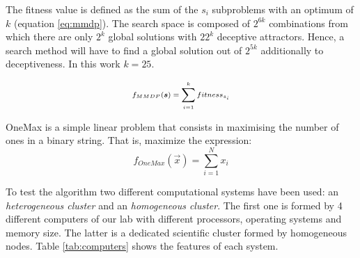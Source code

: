 The fitness value is defined as the sum of the $s_i$ subproblems with an optimum of $k$ (equation \ref{eq:mmdp}).
The search space is composed of $2^{6k}$ combinations from which there
are only $2^k$ global solutions with $22^k$ deceptive
attractors. Hence, a search method will have to find a global solution
out of $2^{5k}$ additionally to deceptiveness. In this work $k=25$. 

\begin{equation}\label{eq:mmdp}
\scriptsize
f_{MMDP}(\vec s)= \sum_{i=1}^{k} fitness_{s_i}
\end{equation}

OneMax is a simple linear problem that consists in maximising the number of ones in a binary string. That is, maximize the expression:
\begin{equation}
f_{OneMax}(\vec{x}) = \sum_{i=1}^{N}{x_{i}}
\end{equation}


To test the algorithm two different computational systems have been used: an {\em heterogeneous cluster} and an {\em homogeneous cluster}. The first one is formed by 4 different computers of our lab with different processors, operating systems and memory size. The latter is a dedicated scientific cluster formed by homogeneous nodes. Table \ref{tab:computers} shows the features of each system.

\begin{table*}
\label{tab:computers}
\end{table*}

